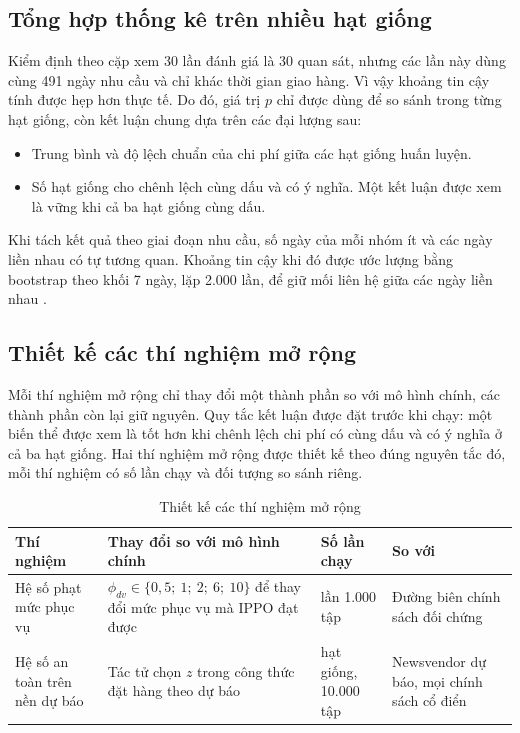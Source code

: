\subsection{Tổng hợp thống kê trên nhiều hạt giống}
\label{subsec:thongKe}

Kiểm định theo cặp xem 30 lần đánh giá là 30 quan sát, nhưng các lần này dùng cùng 491 ngày nhu cầu và chỉ khác thời gian giao hàng. Vì vậy khoảng tin cậy tính được hẹp hơn thực tế. Do đó, giá trị $p$ chỉ được dùng để so sánh trong từng hạt giống, còn kết luận chung dựa trên các đại lượng sau:
\begin{itemize}
    \item Trung bình và độ lệch chuẩn của chi phí giữa các hạt giống huấn luyện.
    \item Số hạt giống cho chênh lệch cùng dấu và có ý nghĩa. Một kết luận được xem là vững khi cả ba hạt giống cùng dấu.
\end{itemize}

Khi tách kết quả theo giai đoạn nhu cầu, số ngày của mỗi nhóm ít và các ngày liền nhau có tự tương quan. Khoảng tin cậy khi đó được ước lượng bằng bootstrap theo khối 7 ngày, lặp 2.000 lần, để giữ mối liên hệ giữa các ngày liền nhau \parencite{kunsch1989}.

\subsection{Thiết kế các thí nghiệm mở rộng}
\label{subsec:thiNghiemMoRong}

Mỗi thí nghiệm mở rộng chỉ thay đổi một thành phần so với mô hình chính, các thành phần còn lại giữ nguyên. Quy tắc kết luận được đặt trước khi chạy: một biến thể được xem là tốt hơn khi chênh lệch chi phí có cùng dấu và có ý nghĩa ở cả ba hạt giống. Hai thí nghiệm mở rộng được thiết kế theo đúng nguyên tắc đó, mỗi thí nghiệm có số lần chạy và đối tượng so sánh riêng.

\begin{table}[H]
    \centering
    \caption{Thiết kế các thí nghiệm mở rộng}
    \label{tab:thiNghiemMoRong}
    \small
    \begin{tabular}{|>{\raggedright\arraybackslash}p{3.1cm}|>{\raggedright\arraybackslash}p{5.8cm}|>{\raggedright\arraybackslash}p{2.4cm}|>{\raggedright\arraybackslash}p{2.4cm}|}
        \hline
        Thí nghiệm & Thay đổi so với mô hình chính & Số lần chạy & So với \\
        \hline
        Hệ số phạt mức phục vụ & $\phi_{dv} \in \{0{,}5;\ 1;\ 2;\ 6;\ 10\}$ để thay đổi mức phục vụ mà IPPO đạt được & 5 lần 1.000 tập & Đường biên chính sách đối chứng \\ \hline
        Hệ số an toàn trên nền dự báo & Tác tử chọn $z$ trong công thức đặt hàng theo dự báo & 3 hạt giống, 10.000 tập & Newsvendor dự báo, mọi chính sách cổ điển \\
        \hline
    \end{tabular}
\end{table}

